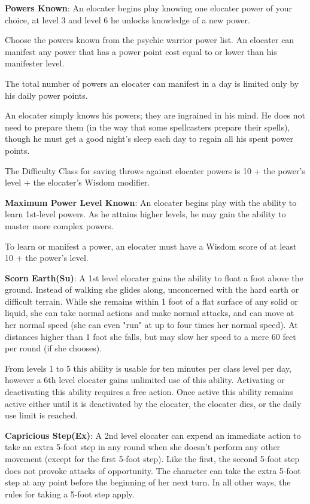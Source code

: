 \textbf{Powers Known}: An elocater begins play knowing one elocater power of your choice, at level 3 and level 6 he unlocks knowledge of a new power.

Choose the powers known from the psychic warrior power list. An elocater can manifest any power that has a power point cost equal to or lower than his manifester level.

The total number of powers an elocater can manifest in a day is limited only by his daily power points.

An elocater simply knows his powers; they are ingrained in his mind. He does not need to prepare them (in the way that some spellcasters prepare their spells), though he must get a good night’s sleep each day to regain all his spent power points.

The Difficulty Class for saving throws against elocater powers is 10 + the power’s level + the elocater’s Wisdom modifier.

\textbf{Maximum Power Level Known}: An elocater begins play with the ability to learn 1st-level powers. As he attains higher levels, he may gain the ability to master more complex powers.

To learn or manifest a power, an elocater must have a Wisdom score of at least 10 + the power’s level.

\textbf{Scorn Earth(Su)}: A 1st level elocater gains the ability to float a foot above the ground. Instead of walking she glides along, unconcerned with the hard earth or difficult terrain. While she remains within 1 foot of a flat surface of any solid or liquid, she can take normal actions and make normal attacks, and can move at her normal speed (she can even "run" at up to four times her normal speed). At distances higher than 1 foot she falls, but may slow her speed to a mere 60 feet per round (if she chooses). 

From levels 1 to 5 this ability is usable for ten minutes per class level per day, however a 6th level elocater gains unlimited use of this ability. Activating or deactivating this ability requires a free action. Once active this ability remains active either until it is deactivated by the elocater, the elocater dies, or the daily use limit is reached.

\textbf{Capricious Step(Ex)}: A 2nd level elocater can expend an immediate action to take an extra 5-foot step in any round when she doesn’t perform any other movement (except for the first 5-foot step). Like the first, the second 5-foot step does not provoke attacks of opportunity. The character can take the extra 5-foot step at any point before the beginning of her next turn. In all other ways, the rules for taking a 5-foot step apply.

